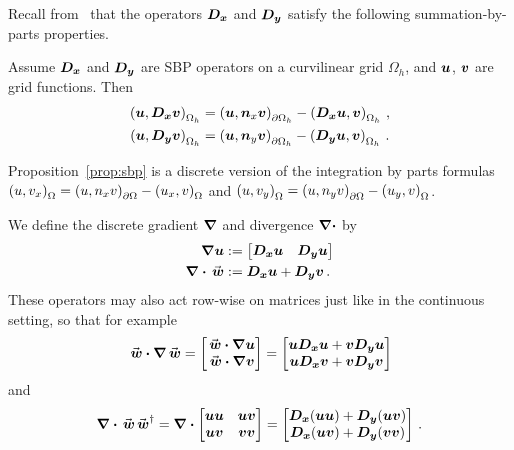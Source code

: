 Recall from~\cite{aalund2019encapsulated} that the operators $\bm{D_x}$ and $\bm{D_y}$ satisfy the following summation-by-parts properties.
\begin{proposition}%
  \label{prop:sbp}
  Assume $\bm{D_x}$ and $\bm{D_y}$ are SBP operators on a curvilinear grid $\Omega_h$, and $\bm{u}$, $\bm{v}$ are grid functions. Then
  \begin{align*}
    \left(\bm{u}, \bm{D_x} \bm{v}\right)_{\Omega_h} &= \left(\bm{u}, \bm{n}_x \bm{v}\right)_{\partial \Omega_h} - \left(\bm{D_x} \bm{u}, \bm{v}\right)_{\Omega_h} \,, \\
    \left(\bm{u}, \bm{D_y} \bm{v}\right)_{\Omega_h} &= \left(\bm{u}, \bm{n}_y \bm{v}\right)_{\partial \Omega_h} - \left(\bm{D_y} \bm{u}, \bm{v}\right)_{\Omega_h} \,.
  \end{align*}
\end{proposition}

\begin{remark}
  Proposition~\ref{prop:sbp} is a discrete version of the integration by parts formulas $\left(u, v_x\right)_\Omega = \left(u, n_x v\right)_{\partial \Omega} - \left(u_x, v\right)_\Omega$ and $\left(u, v_y\right)_\Omega = \left(u, n_y v\right)_{\partial \Omega} - \left(u_y, v\right)_\Omega$.
\end{remark}

We define the discrete gradient $\bm{\nabla}$ and divergence $\bm{\nabla\cdot}$ by
\begin{align*}
  \nablan \un &:=
  \begin{bmatrix}
    \Dx \un & \Dy \un
  \end{bmatrix} \\
  \divn \wn &:= \Dx \un + \Dy \vn \,.
\end{align*}
These operators may also act row-wise on matrices just like in the continuous setting, so that for example
\begin{align*}
  \wn \cdotn \nablan \wn =
  \begin{bmatrix}
    \wn \cdotn \nablan \un \\
    \wn \cdotn \nablan \vn
  \end{bmatrix}
  =
  \begin{bmatrix}
    \un \Dx \un + \vn \Dy \un \\
    \un \Dx \vn + \vn \Dy \vn
  \end{bmatrix}
\end{align*}
and
\begin{align*}
  \divn \wn\wn^\dagger =
  \divn
  \begin{bmatrix}
    \un\un & \un\vn \\
    \un\vn & \vn\vn
  \end{bmatrix}
  =
  \begin{bmatrix}
    \Dx(\un\un) + \Dy(\un\vn) \\
    \Dx(\un\vn) + \Dy(\vn\vn)
  \end{bmatrix} \,.
\end{align*}


